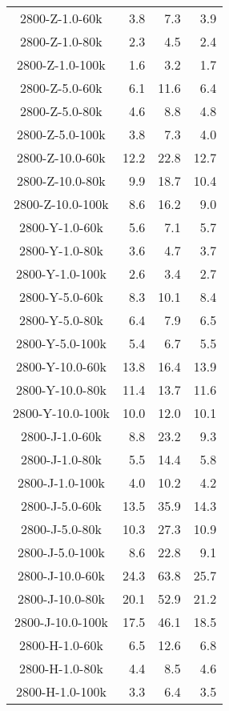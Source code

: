 \begin{longtable}{crrr}
    2800-Z-1.0-60k &   3.8 &    7.3 &   3.9 \\
    2800-Z-1.0-80k &   2.3 &    4.5 &   2.4 \\
    2800-Z-1.0-100k &   1.6 &    3.2 &   1.7 \\
    2800-Z-5.0-60k &   6.1 &   11.6 &   6.4 \\
    2800-Z-5.0-80k &   4.6 &    8.8 &   4.8 \\
    2800-Z-5.0-100k &   3.8 &    7.3 &   4.0 \\
    2800-Z-10.0-60k &  12.2 &   22.8 &  12.7 \\
    2800-Z-10.0-80k &   9.9 &   18.7 &  10.4 \\
    2800-Z-10.0-100k &   8.6 &   16.2 &   9.0 \\
    2800-Y-1.0-60k &   5.6 &    7.1 &   5.7 \\
    2800-Y-1.0-80k &   3.6 &    4.7 &   3.7 \\
    2800-Y-1.0-100k &   2.6 &    3.4 &   2.7 \\
    2800-Y-5.0-60k &   8.3 &   10.1 &   8.4 \\
    2800-Y-5.0-80k &   6.4 &    7.9 &   6.5 \\
    2800-Y-5.0-100k &   5.4 &    6.7 &   5.5 \\
    2800-Y-10.0-60k &  13.8 &   16.4 &  13.9 \\
    2800-Y-10.0-80k &  11.4 &   13.7 &  11.6 \\
    2800-Y-10.0-100k &  10.0 &   12.0 &  10.1 \\
    2800-J-1.0-60k &   8.8 &   23.2 &   9.3 \\
    2800-J-1.0-80k &   5.5 &   14.4 &   5.8 \\
    2800-J-1.0-100k &   4.0 &   10.2 &   4.2 \\
    2800-J-5.0-60k &  13.5 &   35.9 &  14.3 \\
    2800-J-5.0-80k &  10.3 &   27.3 &  10.9 \\
    2800-J-5.0-100k &   8.6 &   22.8 &   9.1 \\
    2800-J-10.0-60k &  24.3 &   63.8 &  25.7 \\
    2800-J-10.0-80k &  20.1 &   52.9 &  21.2 \\
    2800-J-10.0-100k &  17.5 &   46.1 &  18.5 \\
    2800-H-1.0-60k &   6.5 &   12.6 &   6.8 \\
    2800-H-1.0-80k &   4.4 &    8.5 &   4.6 \\
    2800-H-1.0-100k &   3.3 &    6.4 &   3.5 \\

\end{longtable}

